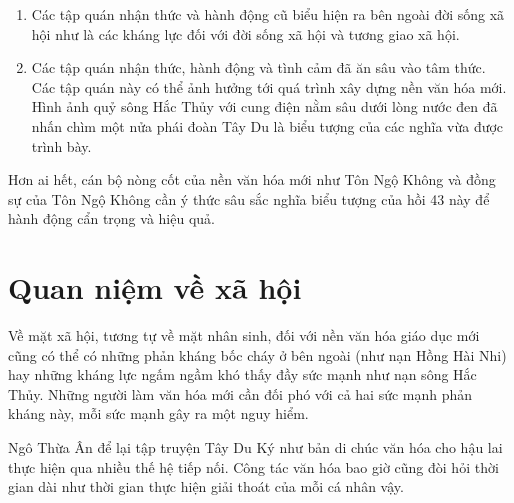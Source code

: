 \begin{enumerate}[label=\itshape\alph*\upshape/]
    \item Các tập quán nhận thức và hành động cũ biểu hiện ra bên ngoài đời sống xã hội như là các kháng lực đối với đời sống xã hội và tương giao xã hội.

    \item Các tập quán nhận thức, hành động và tình cảm đã ăn sâu vào tâm thức. Các tập quán này có thể ảnh hưởng tới quá trình xây dựng nền văn hóa mới. Hình ảnh quỷ sông Hắc Thủy với cung điện nằm sâu dưới lòng nước đen đã nhấn chìm một nửa phái đoàn Tây Du là biểu tượng của các nghĩa vừa được trình bày.
\end{enumerate}

Hơn ai hết, cán bộ nòng cốt của nền văn hóa mới như Tôn Ngộ Không và đồng sự của Tôn Ngộ Không cần ý thức sâu sắc nghĩa biểu tượng của hồi 43 này để hành động cẩn trọng và hiệu quả.

\section{Quan niệm về xã hội} %
\label{sec:43_xa_hoi}

Về mặt xã hội, tương tự về mặt nhân sinh, đối với nền văn hóa giáo dục mới cũng có thể có những phản kháng bốc cháy ở bên ngoài (như nạn Hồng Hài Nhi) hay những kháng lực ngấm ngầm khó thấy đầy sức mạnh như nạn sông Hắc Thủy. Những người làm văn hóa mới cần đối phó với cả hai sức mạnh phản kháng này, mỗi sức mạnh gây ra một nguy hiểm.

Ngô Thừa Ân để lại tập truyện Tây Du Ký như bản di chúc văn hóa cho hậu lai thực hiện qua nhiều thế hệ tiếp nối. Công tác văn hóa bao giờ cũng đòi hỏi thời gian dài như thời gian thực hiện giải thoát của mỗi cá nhân vậy.
